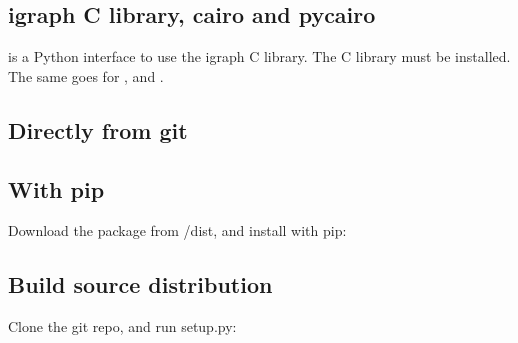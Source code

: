 \documentclass[letterpaper,10pt,english]{sphinxmanual}
\begin{document}
\subsection{igraph C library, cairo and pycairo}
\label{\detokenize{installation:igraph-c-library-cairo-and-pycairo}}
 is a Python interface to use the igraph C library. The
C library must be installed. The same goes for ,  and
.


\subsection{Directly from git}
\label{\detokenize{installation:directly-from-git}}
%
\begin{sphinxVerbatim}[commandchars=\\\{\}]
  
\end{sphinxVerbatim}


\subsection{With pip}
\label{\detokenize{installation:with-pip}}
Download the package from /dist, and install with pip:

%
\begin{sphinxVerbatim}[commandchars=\\\{\}]
  
\end{sphinxVerbatim}


\subsection{Build source distribution}
\label{\detokenize{installation:build-source-distribution}}
Clone the git repo, and run setup.py:

%
\begin{sphinxVerbatim}[commandchars=\\\{\}]
  
\end{sphinxVerbatim}
\end{document}
